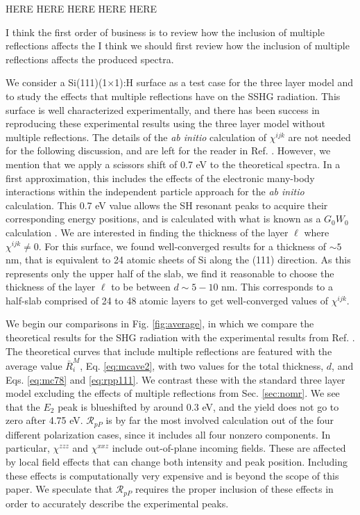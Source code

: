 {\color{red} HERE HERE HERE HERE HERE}

I think the first order of business is to review how the inclusion of multiple reflections affects the 
I think we should first review how the inclusion of multiple reflections affects the produced spectra. 

We consider a Si(111)(1$\times$1):H surface as a test case for the three layer model and to study the effects that multiple reflections have on the SSHG radiation. This surface is well characterized experimentally,\cite{mitchellSS01, mejiaPRB02, bergfeldPRL04} and there has been success in reproducing these experimental results using the three layer model without multiple reflections.\cite{andersonPRB16} The details of the \emph{ab initio} calculation of $\chi^{ijk}$ are not needed for the following discussion, and are left for the reader in Ref. \cite{andersonPRB16}. However, we mention that we apply a scissors shift of 0.7 eV to the theoretical spectra. In a first approximation, this includes the effects of the electronic many-body interactions within the independent particle approach for the \emph{ab initio} calculation. This 0.7 eV value allows the SH resonant peaks to acquire their corresponding energy positions, and is calculated with what is known as a $G_{0}W_{0}$ calculation \cite{andersonPRB16}. We are interested in finding the thickness of the layer $\ell$ where $\chi^{ijk} \ne 0$. For this surface, we found well-converged results for a thickness of $\sim 5$ nm, that is equivalent to 24 atomic sheets of Si along the (111) direction. As this represents only the upper half of the slab, we find it reasonable to choose the thickness of the layer $\ell$ to be between $d\sim 5-10$ nm. This corresponds to a half-slab comprised of 24 to 48 atomic layers to get well-converged values of $\chi^{ijk}$.

We begin our comparisons in Fig. \ref{fig:average}, in which we compare the theoretical results for the SHG radiation with the experimental results from Ref. \cite{mejiaPRB02}. The theoretical curves that include multiple reflections are featured with the average value $\bar{R}^{M}_{i}$, Eq. \eqref{eq:mcave2}, with two values for the total thickness, $d$, and Eqs. \eqref{eq:mc78} and \eqref{eq:rpp111}. We contrast these with the standard three layer model excluding the effects of multiple reflections from Sec. \ref{sec:nomr}. We see that the $E_{2}$ peak is blueshifted by around 0.3 eV, and the yield does not go to zero after 4.75 eV. $\mathcal{R}_{pP}$ is by far the most involved calculation out of the four different polarization cases, since it includes all four nonzero components. In particular, $\chi^{zzz}$ and $\chi^{xxz}$ include out-of-plane incoming fields. These are affected by local field effects that can change both intensity and peak position.\cite{tancognedejean:tel-01235611} Including these effects is computationally very expensive and is beyond the scope of this paper. We speculate that $\mathcal{R}_{pP}$ requires the proper inclusion of these effects in order to accurately describe the experimental peaks.

